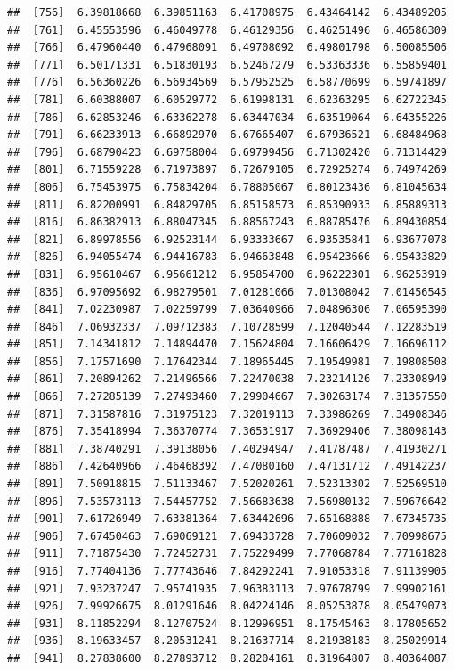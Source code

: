 \documentclass[
  11pt]{report}
\begin{document}
\begin{itemize}
\begin{verbatim}
##  [756]  6.39818668  6.39851163  6.41708975  6.43464142  6.43489205
##  [761]  6.45553596  6.46049778  6.46129356  6.46251496  6.46586309
##  [766]  6.47960440  6.47968091  6.49708092  6.49801798  6.50085506
##  [771]  6.50171331  6.51830193  6.52467279  6.53363336  6.55859401
##  [776]  6.56360226  6.56934569  6.57952525  6.58770699  6.59741897
##  [781]  6.60388007  6.60529772  6.61998131  6.62363295  6.62722345
##  [786]  6.62853246  6.63362278  6.63447034  6.63519064  6.64355226
##  [791]  6.66233913  6.66892970  6.67665407  6.67936521  6.68484968
##  [796]  6.68790423  6.69758004  6.69799456  6.71302420  6.71314429
##  [801]  6.71559228  6.71973897  6.72679105  6.72925274  6.74974269
##  [806]  6.75453975  6.75834204  6.78805067  6.80123436  6.81045634
##  [811]  6.82200991  6.84829705  6.85158573  6.85390933  6.85889313
##  [816]  6.86382913  6.88047345  6.88567243  6.88785476  6.89430854
##  [821]  6.89978556  6.92523144  6.93333667  6.93535841  6.93677078
##  [826]  6.94055474  6.94416783  6.94663848  6.95423666  6.95433829
##  [831]  6.95610467  6.95661212  6.95854700  6.96222301  6.96253919
##  [836]  6.97095692  6.98279501  7.01281066  7.01308042  7.01456545
##  [841]  7.02230987  7.02259799  7.03640966  7.04896306  7.06595390
##  [846]  7.06932337  7.09712383  7.10728599  7.12040544  7.12283519
##  [851]  7.14341812  7.14894470  7.15624804  7.16606429  7.16696112
##  [856]  7.17571690  7.17642344  7.18965445  7.19549981  7.19808508
##  [861]  7.20894262  7.21496566  7.22470038  7.23214126  7.23308949
##  [866]  7.27285139  7.27493460  7.29904667  7.30263174  7.31357550
##  [871]  7.31587816  7.31975123  7.32019113  7.33986269  7.34908346
##  [876]  7.35418994  7.36370774  7.36531917  7.36929406  7.38098143
##  [881]  7.38740291  7.39138056  7.40294947  7.41787487  7.41930271
##  [886]  7.42640966  7.46468392  7.47080160  7.47131712  7.49142237
##  [891]  7.50918815  7.51133467  7.52020261  7.52313302  7.52569510
##  [896]  7.53573113  7.54457752  7.56683638  7.56980132  7.59676642
##  [901]  7.61726949  7.63381364  7.63442696  7.65168888  7.67345735
##  [906]  7.67450463  7.69069121  7.69433728  7.70609032  7.70998675
##  [911]  7.71875430  7.72452731  7.75229499  7.77068784  7.77161828
##  [916]  7.77404136  7.77743646  7.84292241  7.91053318  7.91139905
##  [921]  7.93237247  7.95741935  7.96383113  7.97678799  7.99902161
##  [926]  7.99926675  8.01291646  8.04224146  8.05253878  8.05479073
##  [931]  8.11852294  8.12707524  8.12996951  8.17545463  8.17805652
##  [936]  8.19633457  8.20531241  8.21637714  8.21938183  8.25029914
##  [941]  8.27838600  8.27893712  8.28204161  8.31964807  8.40364087

\end{verbatim}
\end{itemize}
\end{document}
